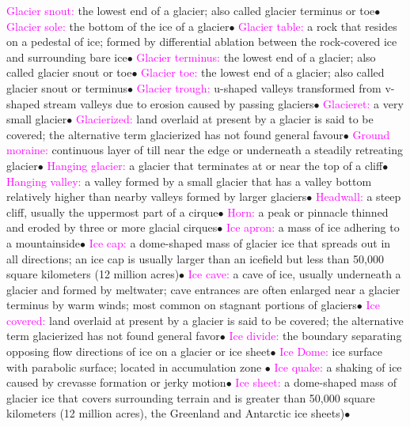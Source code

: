 \documentclass{article}
\newcommand{\ddd}{$\bullet$}
\newcommand{\pink}[1]{\textcolor{magenta}{#1}}
\newcommand{\vocab}[1]{{\pink{#1}}}
\begin{document}
\begin{multicols*}{4}
		\vocab{        Glacier snout: } the lowest end of a glacier; also called glacier terminus or toe\ddd
		\vocab{        Glacier sole: } the bottom of the ice of a glacier\ddd
		\vocab{        Glacier table: } a rock that resides on a pedestal of ice; formed by differential ablation between the rock-covered ice and surrounding bare ice\ddd
		\vocab{        Glacier terminus: } the lowest end of a glacier; also called glacier snout or toe\ddd
		\vocab{        Glacier toe: } the lowest end of a glacier; also called glacier snout or terminus\ddd
		\vocab{        Glacier trough: } u-shaped valleys transformed from v-shaped stream valleys due to erosion caused by passing glaciers\ddd
		\vocab{        Glacieret: } a very small glacier\ddd
		\vocab{        Glacierized: } land overlaid at present by a glacier is said to be covered; the alternative term glacierized has not found general favour\ddd
		\vocab{        Ground moraine: } continuous layer of till near the edge or underneath a steadily retreating glacier\ddd
		\vocab{        Hanging glacier: } a glacier that terminates at or near the top of a cliff\ddd
		\vocab{        Hanging valley: } a valley formed by a small glacier that has a valley bottom relatively higher than nearby valleys formed by larger glaciers\ddd
		\vocab{        Headwall: } a steep cliff, usually the uppermost part of a cirque\ddd
		\vocab{        Horn: } a peak or pinnacle thinned and eroded by three or more glacial cirques\ddd
		\vocab{        Ice apron: } a mass of ice adhering to a mountainside\ddd
		\vocab{        Ice cap: } a dome-shaped mass of glacier ice that spreads out in all directions; an ice cap is usually larger than an icefield but less than 50,000 square kilometers (12 million acres)\ddd
		\vocab{        Ice cave: } a cave of ice, usually underneath a glacier and formed by meltwater; cave entrances are often enlarged near a glacier terminus by warm winds; most common on stagnant portions of glaciers\ddd
		\vocab{        Ice covered: } land overlaid at present by a glacier is said to be covered; the alternative term glacierized has not found general favor\ddd
		\vocab{        Ice divide: } the boundary separating opposing flow directions of ice on a glacier or ice sheet\ddd
		\vocab{        Ice Dome: } ice surface with parabolic surface; located in accumulation zone \ddd 
		\vocab{        Ice quake: } a shaking of ice caused by crevasse formation or jerky motion\ddd
		\vocab{        Ice sheet: } a dome-shaped mass of glacier ice that covers surrounding terrain and is greater than 50,000 square kilometers (12 million acres), the Greenland and Antarctic ice sheets)\ddd

\end{multicols*}
\end{document}
